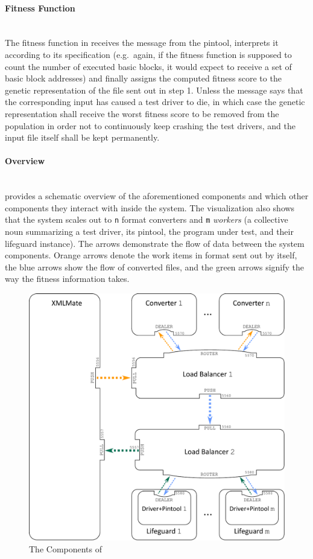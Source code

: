   \paragraph{Fitness Function} ~\\
  The fitness function in \xmlmate receives the message from the pintool, interprets it according to 
  its specification (e.g.\ again, if the fitness function is supposed to count the number of executed basic
  blocks, it would expect to receive a set of basic block addresses) and finally assigns the computed fitness score to 
  the genetic representation of the \xml file sent out in step 1. Unless the message says that the
  corresponding input has caused a test driver to die, in which case the genetic representation shall receive
  the worst fitness score to be removed from the population in order not to continuously keep crashing the test
  drivers, and the input file itself shall be kept permanently.

\paragraph{Overview} ~\\
 provides a schematic overview of the aforementioned components and which other components 
they interact with inside the system. The visualization also shows that the system scales out to \texttt{n}
format converters and \texttt{m} \emph{workers} (a collective noun summarizing a test driver, its
pintool, the program under test, and their lifeguard instance). The arrows demonstrate the flow of data between
the system components. Orange arrows denote the work items in \xml format sent out by \xmlmate itself, the blue arrows show
the flow of converted files, and the green arrows signify the way the fitness information takes.

\begin{figure}[H]
\centering
  \includegraphics[width=\columnwidth]{system.pdf} 
  \caption{The Components of \xmlmate}
  \label{fig:components}
\end{figure}

